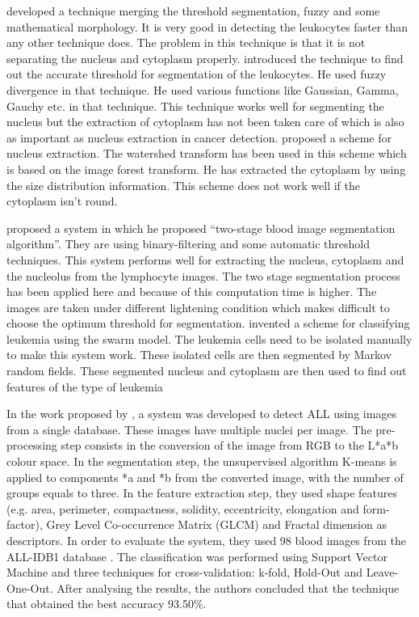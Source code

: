 \documentclass[review]{elsarticle}
\begin{document}
\citet{Related4} developed a technique merging the threshold segmentation, fuzzy and some mathematical morphology. It is very good in detecting the leukocytes faster than any other technique does. The problem in this technique is that it is not separating the nucleus and cytoplasm properly. \citet{Related5} introduced the technique to find out the accurate threshold for segmentation of the leukocytes.
He used fuzzy divergence in that technique. He used various functions like Gaussian, Gamma, Gauchy etc. in that technique. This technique works well for segmenting the nucleus but the extraction of cytoplasm has not been taken care of which is also as important as nucleus extraction in cancer detection. \citet{Related6} proposed a scheme for nucleus extraction. The watershed transform has been used in this scheme which is based on the image forest transform. He has extracted the cytoplasm by using the size distribution information. This scheme does not work well if the cytoplasm isn’t round.  

\citet{Related7} proposed a system in which he proposed “two-stage blood image segmentation algorithm”. They are using binary-filtering and some automatic threshold techniques. This system performs well for extracting the nucleus, cytoplasm and the nucleolus from the lymphocyte images. The two stage segmentation process has been applied here and because of this computation time is higher. The images are taken under different lightening condition which makes difficult to choose the optimum threshold for segmentation. \citet{Related8} invented a scheme for classifying leukemia using the swarm model. The leukemia cells need to be isolated manually to make this system work. These isolated cells are then segmented by Markov random fields. These segmented nucleus and cytoplasm are then used to find out features of the type of leukemia 

In the work proposed by \citet{Related9}, a system was developed to detect ALL using images from a single database. These images have multiple nuclei per image. The pre-processing step consists in the conversion of the image from RGB to the L*a*b colour space. In the segmentation step, the unsupervised algorithm K-means is applied to components *a and *b from the converted image, with the number of groups equals to three. In the feature extraction step, they used shape features (e.g. area, perimeter, compactness, solidity, eccentricity, elongation and form-factor), Grey Level Co-occurrence Matrix (GLCM) \citep{Related10} and Fractal dimension \citep{Related11} as descriptors. In order to evaluate the system, they used 98 blood images from the ALL-IDB1 database \citep{Related12}. The classification was performed using Support Vector Machine and three techniques for cross-validation: k-fold, Hold-Out and Leave-One-Out. After analysing the results, the authors concluded that the technique that obtained the best accuracy 93.50\%.  
\end{document}
